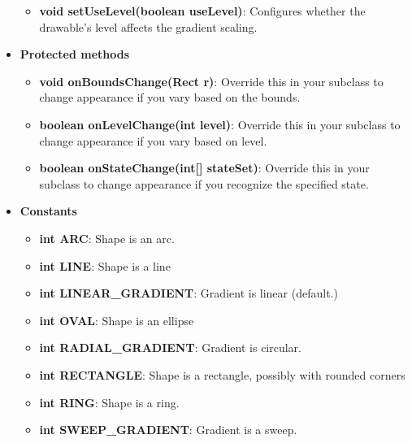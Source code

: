 \documentclass{report}
\begin{document}
\begin{itemize}
\begin{itemize}
            \item \textbf{void setUseLevel(boolean useLevel)}: Configures whether the drawable’s level affects the gradient scaling.
        \end{itemize}
        \item \textbf{Protected methods}
            \begin{itemize}
                \item \textbf{void onBoundsChange(Rect r)}: Override this in your subclass to change appearance if you vary based on the bounds.
                \item \textbf{boolean onLevelChange(int level)}: Override this in your subclass to change appearance if you vary based on level.
                \item \textbf{boolean onStateChange(int[] stateSet)}: Override this in your subclass to change appearance if you recognize the specified state.
            \end{itemize}
        \item \textbf{Constants}
            \begin{itemize}
                \item \textbf{int ARC}: Shape is an arc.
                \item \textbf{int LINE}: Shape is a line
                \item \textbf{int LINEAR\_GRADIENT}: Gradient is linear (default.)
                \item \textbf{int OVAL}: Shape is an ellipse
                \item \textbf{int RADIAL\_GRADIENT}: Gradient is circular.
                \item \textbf{int RECTANGLE}: Shape is a rectangle, possibly with rounded corners
                \item \textbf{int RING}: Shape is a ring.
                \item \textbf{int SWEEP\_GRADIENT}: Gradient is a sweep.
            \end{itemize}
    \end{itemize}

    \pagebreak 
\end{document}
